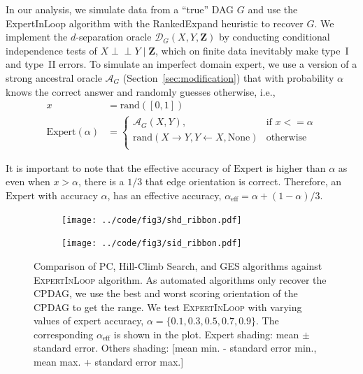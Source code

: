 \documentclass{uai2025} %
\def\ci{\perp\!\!\!\!\perp}
\begin{document}
In our analysis, we simulate data from a ``true'' DAG $G$ and use the
{\sc ExpertInLoop} algorithm with the {\sc RankedExpand} heuristic 
to recover $G$. We implement the $d$-separation oracle $\mathcal{D}_G(X,Y,\mathbf{Z})$
by conducting conditional independence tests of $X \ci Y \mid \mathbf{Z}$, which on finite
data inevitably make type~I and type~II errors. To
simulate an imperfect domain expert, we use a version of a strong 
ancestral oracle $\mathcal{A}_G$ (Section~\ref{sec:modification})
that with probability $\alpha$ knows the correct answer and randomly
guesses otherwise, i.e.,
\begin{equation*}
	\begin{split}
		x &= \textrm{rand}([0, 1]) \\
		\mathrm{Expert}(\alpha) &= \begin{cases} 
			\mathcal{A}_G(X, Y),  & \textrm{if  } x <= \alpha \\
			\textrm{rand}(X \rightarrow Y, Y \leftarrow X, \textrm{None}) & \textrm{otherwise} \\
				\end{cases} 
	\end{split}
\end{equation*}

It is important to note that the effective accuracy of $ \mathrm{Expert} $ is
higher than $ \alpha $ as even when $ x > \alpha $, there is a $ 1/3 $
that edge orientation is correct. Therefore, an $ \mathrm{Expert} $ with
accuracy $ \alpha $, has an effective accuracy, $ \alpha_{\mathrm{eff}} =
\alpha + (1 - \alpha) / 3 $.

\begin{figure}[t!]
	\centering
	\begin{subfigure}{0.5\textwidth}
		\centering
		\texttt{[image: ../code/fig3/shd\_ribbon.pdf]}
		\caption{}
	\end{subfigure}
	\begin{subfigure}{0.5\textwidth}
		\centering
		\texttt{[image: ../code/fig3/sid\_ribbon.pdf]}
		\caption{}
	\end{subfigure}
	\caption{Comparison of PC, Hill-Climb Search, and GES algorithms against
		\textsc{ExpertInLoop} algorithm. As automated algorithms only
		recover the CPDAG, we use the best and worst scoring
		orientation of the CPDAG to get the range. We test
		\textsc{ExpertInLoop} with varying values of expert accuracy, $ \alpha = \{0.1, 0.3, 0.5, 0.7, 0.9\} $. The corresponding
	$\alpha_{\textrm{eff}} $ is shown in the plot. Expert shading: mean $\pm$ standard error. Others shading: [mean min. - standard error min., mean max. + standard error max.]}
	\label{fig:shd_sid}
\end{figure}
\end{document}
